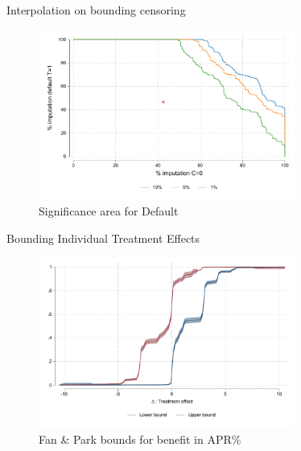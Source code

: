 \documentclass[8pt]{beamer}
\begin{document}
\begin{frame}{Interpolation on bounding censoring}
    
\begin{figure}[H]
        \caption{Significance area for Default}
    \label{interpolation_censoring_imp}
    \begin{center}
        \includegraphics[width=0.75\textwidth]{Figuras/frontera_sig_def_imp.pdf}
    \end{center}
\end{figure}
\end{frame}


\begin{frame}{Bounding Individual Treatment Effects}
\label{fan_park_bounds}    

\begin{figure}[H]
    \caption{Fan \& Park bounds for benefit in APR\% }
    
    \begin{center}
        \includegraphics[width=0.75\textwidth]{Figuras/fan_park_bounds_apr.pdf}
    \end{center}
   
\end{figure}
 \hyperlink{choice_hte}{}
\end{frame}
\end{document}
